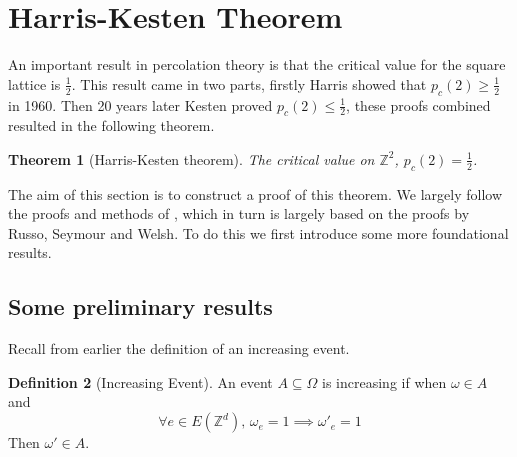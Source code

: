 \documentclass[a4paper,11pt]{article}
\newtheorem{theorem}{Theorem}[section]
\theoremstyle{definition}
\newtheorem{definition}[theorem]{Definition}
\newcommand{\ints}{\mathbb{Z}}
\begin{document}
\section{Harris-Kesten Theorem} \label{HarrisKesten}
An important result in percolation theory is that the critical value for the square lattice is $\frac{1}{2}$. 
This result came in two parts, firstly Harris \cite{harris_1960} showed that $p_c(2) \geq \frac{1}{2}$ in 1960.
Then 20 years later Kesten \cite{kesten1980critical} proved $p_c(2) \leq \frac{1}{2}$, these proofs combined resulted in the following theorem.

\begin{theorem}[Harris-Kesten theorem]
	The critical value on $\ints^2$,  $p_c(2) =  \frac{1}{2}$.
\end{theorem}
The aim of this section is to construct a proof of this theorem. We largely follow the proofs and methods of \cite{bollobas2006short}, which in turn is largely based on the proofs by Russo, Seymour and Welsh.
To do this we first introduce some more foundational results.

\subsection{Some preliminary results}
Recall from earlier the definition of an increasing event.
\begin{definition}[Increasing Event]
	An event $ A \subseteq \Omega$ is increasing if when $\omega \in A$ and
	$$\forall e \in E(\ints^d) \text{, } \omega_e = 1 \implies \omega'_e = 1$$
	Then $\omega' \in A$. \\
\end{definition}
\end{document}
